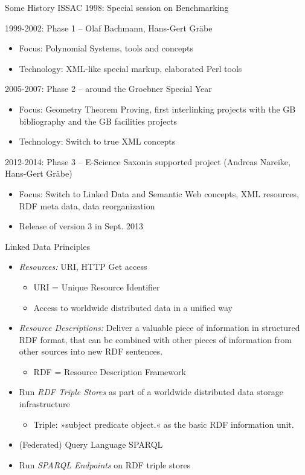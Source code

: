 \documentclass{beamer}
\begin{document}
\begin{frame}{Some History}{}
ISSAC 1998: Special session on Benchmarking 

1999-2002: Phase 1 -- Olaf Bachmann, Hans-Gert Gr\"abe
\begin{itemize}
\item Focus: Polynomial Systems, tools and concepts
\item Technology: XML-like special markup, elaborated Perl tools
\end{itemize}
2005-2007: Phase 2 -- around the Groebner Special Year
\begin{itemize}
\item Focus: Geometry Theorem Proving, first interlinking projects with the GB
  bibliography and the GB facilities projects
\item Technology: Switch to true XML concepts
\end{itemize}
2012-2014: Phase 3 -- E-Science Saxonia supported project (Andreas Nareike,
Hans-Gert Gr\"abe)
\begin{itemize}
\item Focus: Switch to Linked Data and Semantic Web concepts, XML resources,
  RDF meta data, data reorganization
\item Release of version 3 in Sept. 2013
\end{itemize}
\end{frame}

\begin{frame}{Linked Data Principles}{}
\begin{itemize}
\item \emph{Resources:} URI, HTTP Get access
\begin{itemize}
\item URI = Unique Resource Identifier
\item Access to worldwide distributed data in a unified way
\end{itemize}
\item \emph{Resource Descriptions:} Deliver a valuable piece of information in
  structured RDF format, that can be combined with other pieces of information
  from other sources into new RDF sentences.
\begin{itemize}
\item RDF = Resource Description Framework
\end{itemize}
\item Run \emph{RDF Triple Stores} as part of a worldwide distributed data
  storage infrastructure
\begin{itemize}
\item Triple: »subject predicate object.« as the basic RDF information unit.
\end{itemize}
\item (Federated) Query Language SPARQL
\item Run \emph{SPARQL Endpoints} on RDF triple stores
\end{itemize}
\end{frame}
\end{document}
